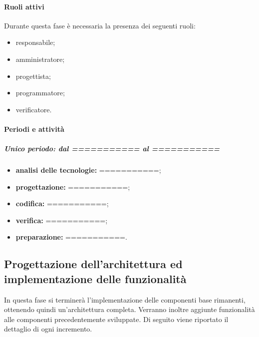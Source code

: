 \paragraph{Ruoli attivi}
Durante questa fase è necessaria la presenza dei seguenti ruoli: 
\begin{itemize} 
	\item responsabile; 
	\item amministratore; 
	\item progettista; 
	\item programmatore; 
	\item verificatore.
\end{itemize}

\paragraph{Periodi e attività}
\subparagraph{Unico periodo: dal =========== al ===========}
\begin{itemize}
	\item \textbf{analisi delle tecnologie:} ===========;
	\item \textbf{progettazione:} ===========;
	\item \textbf{codifica:} ===========;
	\item \textbf{verifica:} ===========;
	\item \textbf{preparazione:} ===========.
\end{itemize}
 
\newpage 


\newpage 

 
\subsection{Progettazione dell'architettura ed implementazione delle funzionalità}
In questa fase si terminerà l'implementazione delle componenti base rimanenti, ottenendo quindi un'architettura completa. Verranno inoltre aggiunte funzionalità alle componenti precedentemente sviluppate.
\newline
Di seguito viene riportato il dettaglio di ogni incremento.

